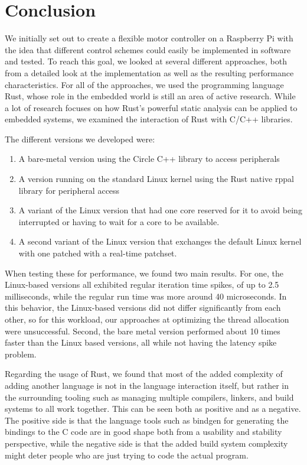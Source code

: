 \chapter{Conclusion}
\label{chap:conclusion}

We initially set out to create a flexible motor controller on a Raspberry Pi
with the idea that different control schemes could easily be implemented in software and tested.
To reach this goal, we looked at several different approaches,
both from a detailed look at the implementation as well as the resulting performance characteristics.
For all of the approaches, we used the programming language Rust,
whose role in the embedded world is still an area of active research.
While a lot of research focuses on how Rust's powerful static analysis can be applied to embedded systems,
we examined the interaction of Rust with C/C++ libraries.

The different versions we developed were:
\begin{enumerate}
    \item A bare-metal version using the Circle C++ library to access peripherals
    \item A version running on the standard Linux kernel using the Rust native rppal library for peripheral access
    \item A variant of the Linux version that had one core reserved for it to avoid being interrupted or having to wait for a core to be available.
    \item A second variant of the Linux version that exchanges the default Linux kernel with one patched with a real-time patchset.
\end{enumerate}

When testing these for performance, we found two main results.
For one, the Linux-based versions all exhibited regular iteration time spikes, of up to 2.5 milliseconds,
while the regular run time was more around 40 microseconds.
In this behavior, the Linux-based versions did not differ significantly from each other,
so for this workload, our approaches at optimizing the thread allocation were unsuccessful.
Second, the bare metal version performed about 10 times faster than the Linux based versions,
all while not having the latency spike problem.

Regarding the usage of Rust, we found that most of the added complexity of adding another language is not in the language interaction itself,
but rather in the surrounding tooling such as managing multiple compilers, linkers, and build systems to all work together.
This can be seen both as positive and as a negative.
The positive side is that the language tools such as bindgen for generating the bindings to the C code are in good shape both from a usability and stability perspective,
while the negative side is that the added build system complexity might deter people who are just trying to code the actual program.

